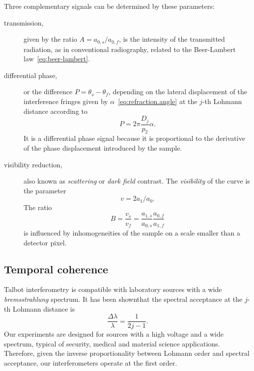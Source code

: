 Three complementary signals can be determined by these parameters:
\begin{description}
    \item[transmission,] given by the ratio $A = a_{0,s} / a_{0,f}$, is the
        intensity of the transmitted radiation, as in conventional
        radiography, related to the Beer-Lambert
        law~\eqref{eq:beer-lambert}.
    \item[differential phase,] or the difference $P = \theta_{s} -
        \theta_f$, depending on the lateral displacement of the interference
        fringes given by
        $\alpha$~\eqref{eq:refraction.angle} at the
        $j$-th Lohmann distance according to
        \begin{equation}
            P = 2\pi \frac{D_j}{p_2}\alpha.\label{eq:differential.phase}
        \end{equation}
        It is a differential phase signal because it is proportional to the
        derivative of the phase displacement introduced by the sample.
    \item[visibility reduction,] also known as 
        \emph{scattering} or \emph{dark field} contrast. The
        \emph{visibility} of the curve is the parameter
        \begin{equation}
            v = 2a_1 / a_0.
            \label{eq:visibility-definition}
        \end{equation}
        The ratio
        \begin{equation}
            B = \frac{v_s}{v_f} =
            \frac{a_{1,s}}{a_{0,s}}\frac{a_{0,f}}{a_{1,f}}
            \label{eq:dark-field-definition}
        \end{equation}
        is influenced by inhomogeneities of the sample on a scale smaller
        than a detector pixel\cn.
\end{description}

\subsection{Temporal coherence}\label{sec:temporal-coherence}
Talbot interferometry is compatible with laboratory sources with a wide
\emph{bremsstrahlung} spectrum. It has been shown\cn that the spectral
acceptance at the $j$-th Lohmann distance is
\begin{equation}
    \frac{\Delta \lambda}{\lambda} = \frac{1}{2j - 1}.\label{eq:acceptance}
\end{equation}
Our experiments are designed for sources with a high voltage and a wide
spectrum, typical of security, medical and material science applications.
Therefore, given the inverse proportionality between Lohmann order
and spectral acceptance, our interferometers operate at the first order.


